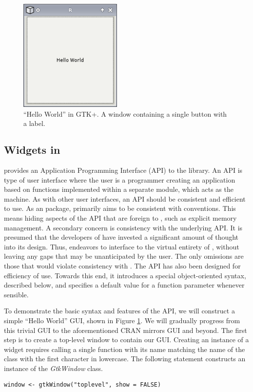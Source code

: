 \documentclass[article]{jss}
\begin{document}
\begin{figure}
\begin{center}
\includegraphics[width=2in]{hello-world.png}
\caption{\label{fig:hello-world}``Hello World'' in GTK+. 
A window containing a single button with a label.}
\end{center}
\end{figure}

\subsection[GTK+ Widgets in R]{ Widgets in }

 provides an Application Programming Interface (API) to the  
library. An API is type of user interface where the user
is a programmer creating an application based on functions implemented within a 
separate module, which acts as the machine. As with other user interfaces,
an API should be consistent and efficient to use. As an  package,
 primarily aims to be consistent with  conventions. This
means hiding aspects of the  API that are foreign to ,
such as explicit memory management. A secondary concern is consistency 
with the underlying  API. It is presumed that the developers of
 have invested a significant amount of thought into its design. Thus,
 endeavors to interface  to the virtual entirety of ,
without leaving any gaps that may be unanticipated by the user. 
The only omissions are those that would violate consistency with .
The  API has also been designed for efficiency of use. Towards this end,
it introduces a special object-oriented syntax, described below, and specifies
a default value for a function parameter whenever sensible.

To demonstrate the basic syntax and
features of the  API, we will construct a simple ``Hello World'' GUI,
shown in Figure \ref{fig:hello-world}. We will gradually 
progress from this trivial GUI to the aforementioned CRAN mirrors GUI and beyond.
The first step is to create a top-level window to contain our GUI.
Creating an instance of a  widget requires calling a single  
function with its name matching the name of the class with the first character in 
lowercase. The following statement constructs an instance of the \emph{GtkWindow} class.
\begin{verbatim}
window <- gtkWindow("toplevel", show = FALSE)
\end{verbatim}
\end{document}
